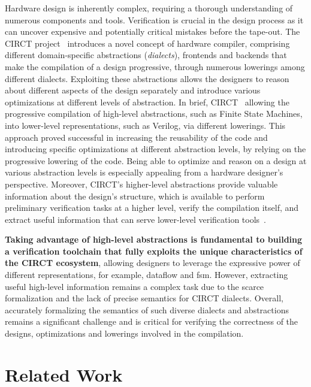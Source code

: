 \documentclass[sigconf,authorversion,nonacm, 11pt]{acmart}
\begin{document}
Hardware design is inherently complex, requiring a thorough understanding of numerous components and tools. 
Verification is crucial in the design process as it can uncover expensive and potentially critical mistakes before the tape-out.
The CIRCT project~\cite{circt, mlir_circt} introduces a novel concept of hardware compiler, comprising different domain-specific abstractions (\textit{dialects}), 
frontends and backends that make the compilation of a design progressive, through numerous lowerings among different dialects. 
Exploiting these abstractions allows the designers to reason about different aspects of the design separately and introduce various 
optimizations at different levels of abstraction.
In brief, CIRCT~\cite{circt, mlir_circt} allowing the progressive compilation of high-level abstractions, such as Finite State Machines, into lower-level representations, 
such as Verilog, via different lowerings. 
This approach proved successful in increasing the reusability of the code and introducing specific optimizations at different abstraction levels, 
by relying on the progressive lowering of the code. 
Being able to optimize and reason on a design at various abstraction levels is especially appealing from a hardware 
designer's perspective. 
Moreover, CIRCT's higher-level abstractions provide valuable information about the design's structure, 
which is available to perform preliminary verification tasks at a higher level, verify the compilation itself, 
and extract useful information that can serve lower-level verification tools~\cite{huang2018instruction, chen2021leveraging, mattarei2018cosa}. 

\textbf{Taking advantage of high-level abstractions is fundamental to building a verification toolchain that fully exploits the unique characteristics 
of the CIRCT ecosystem}, allowing designers to leverage the expressive power of different representations, for example, dataflow and \ac{fsm}. 
However, extracting useful high-level information remains a complex task due to the scarce formalization and the lack of precise 
semantics for CIRCT dialects. Overall, accurately formalizing the semantics of such diverse dialects and abstractions remains a 
significant challenge and is critical for verifying the correctness of the designs, optimizations and lowerings involved in the compilation. 



\section{Related Work}
\end{document}
